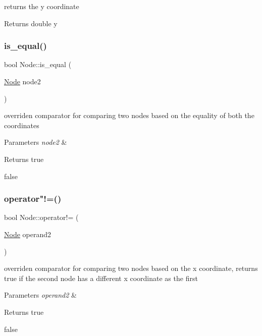 returns the y coordinate 

\begin{DoxyReturn}{Returns}
double y 
\end{DoxyReturn}
\mbox{\label{classNode_aa93a3a9846c909197ba00bfd6fb4a549}} 
\subsubsection{\texorpdfstring{is\+\_\+equal()}{is\_equal()}}
{\footnotesize\ttfamily bool Node\+::is\+\_\+equal (\begin{DoxyParamCaption}\item[{\hyperlink{classNode}{Node}}]{node2 }\end{DoxyParamCaption})}



overriden comparator for comparing two nodes based on the equality of both the coordinates 


\begin{DoxyParams}{Parameters}
{\em node2} & \\
\hline
\end{DoxyParams}
\begin{DoxyReturn}{Returns}
true 

false 
\end{DoxyReturn}
\mbox{\label{classNode_a6fb364f31ad72d22d3ac821e32233c26}} 
\subsubsection{\texorpdfstring{operator"!=()}{operator!=()}}
{\footnotesize\ttfamily bool Node\+::operator!= (\begin{DoxyParamCaption}\item[{\hyperlink{classNode}{Node}}]{operand2 }\end{DoxyParamCaption})}



overriden comparator for comparing two nodes based on the x coordinate, returns true if the second node has a different x coordinate as the first 


\begin{DoxyParams}{Parameters}
{\em operand2} & \\
\hline
\end{DoxyParams}
\begin{DoxyReturn}{Returns}
true 

false 
\end{DoxyReturn}
\mbox{\label{classNode_ab0452101dad47b23bad5419963d85648}} 
